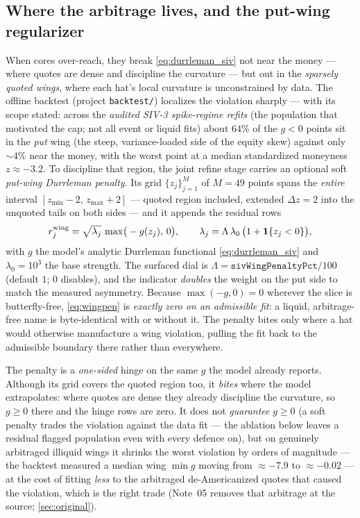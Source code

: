 \documentclass[11pt]{article}
\begin{document}
\subsection{Where the arbitrage lives, and the put-wing regularizer}
\label{sec:wingpen}

When cores over-reach, they break \eqref{eq:durrleman_siv} not near the money ---
where quotes are dense and discipline the curvature --- but out in the
\emph{sparsely quoted wings}, where each hat's local curvature is unconstrained by
data. The offline backtest (project \texttt{backtest/}) localizes the violation
sharply --- with its scope stated: across the \emph{audited SIV-3 spike-regime
refits} (the population that motivated the cap; not all event or liquid fits)
about $64\%$ of the $g<0$ points sit in the \emph{put} wing (the steep,
variance-loaded side of the equity skew) against only $\sim4\%$ near the money,
with the worst point at a median standardized moneyness $z\approx-3.2$. To
discipline that region, the joint refine stage carries an optional soft
\emph{put-wing Durrleman penalty}. Its grid $\{z_j\}_{j=1}^{M}$ of $M=49$
points spans the \emph{entire} interval $[z_{\min}-2,\,z_{\max}+2]$ ---
quoted region included, extended $\Delta z=2$ into the unquoted tails on both
sides --- and it appends the residual rows
\begin{equation}
r^{\text{wing}}_j=\sqrt{\lambda_j}\,\max\!\big(-g(z_j),\,0\big),
\qquad
\lambda_j=\Lambda\,\lambda_0\,\big(1+\mathbf{1}\{z_j<0\}\big),
\label{eq:wingpen}
\end{equation}
with $g$ the model's analytic Durrleman functional \eqref{eq:durrleman_siv}
and $\lambda_0=10^{3}$ the base strength. The surfaced dial is
$\Lambda=\texttt{sivWingPenaltyPct}/100$ (default $1$; $0$ disables), and the
indicator \emph{doubles} the weight on the put side to match the measured
asymmetry. Because
$\max(-g,0)=0$ wherever the slice is butterfly-free, \eqref{eq:wingpen} is
\emph{exactly zero on an admissible fit}: a liquid, arbitrage-free name is
byte-identical with or without it. The penalty bites only where a hat would
otherwise manufacture a wing violation, pulling the fit back to the admissible
boundary there rather than everywhere.

\begin{heuristic}
The penalty is a \emph{one-sided} hinge on the same $g$ the model already
reports. Although its grid covers the quoted region too, it \emph{bites} where
the model extrapolates: where quotes are dense they already discipline the
curvature, so $g\ge0$ there and the hinge rows are zero. It does not
\emph{guarantee} $g\ge0$ (a soft penalty trades the violation against the data
fit --- the ablation below leaves a residual flagged population even with every
defence on), but on genuinely arbitraged illiquid wings it shrinks the worst
violation by orders of magnitude --- the backtest measured a median wing
$\min g$ moving from $\approx-7.9$ to $\approx-0.02$ --- at the cost of
fitting \emph{less} to the arbitraged de-Americanized quotes that caused the
violation, which is the right trade (Note~05 removes that arbitrage at the
source; \cref{sec:original}).
\end{heuristic}
\end{document}
